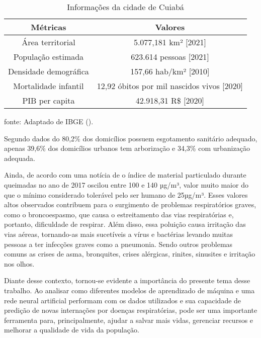 \documentclass[
  12pt,		%
  a4paper,	%
  openright,%
  oneside,	%
  chapter=TITLE,		%
  section=TITLE,		%
  english,	%
  french,	%
  spanish,	%
  brazil	%
]{abntex2}
\begin{document}
    \begin{table}[ht]
        \centering
        \caption{Informações da cidade de Cuiabá}
        \label{tabela cuiaba}
        \begin{tabular}{cc}
            \hline
            \multicolumn{1}{|c|}{Métricas} & \multicolumn{1}{c|}{Valores}\\
            \hline
            Área territorial & 5.077,181 km² [2021]\\
            População estimada & 623.614 pessoas [2021]\\
            Densidade demográfica & 157,66 hab/km² [2010]\\
            Mortalidade infantil & 12,92 óbitos por mil nascidos vivos [2020]\\
            PIB per capita & 42.918,31 R\$ [2020]\\
            \hline
        \end{tabular}
        \par
        {\small fonte: Adaptado de IBGE (\citeyear{ibge}).}
    \end{table}

    Segundo dados do \cite[]{ibge_mais} 80,2\% dos domicílios possuem esgotamento
    sanitário adequado, apenas 39,6\% dos domicílios urbanos tem arborização e
    34,3\% com urbanização adequada.

    Ainda, de acordo com uma notícia de \cite[]{queimadas_cuiaba} o índice de material
    particulado durante queimadas no ano de 2017 oscilou entre 100 e 140 µg/m³, valor
    muito maior do que o mínimo considerado tolerável pelo ser humano de 25µg/m³. Esses valores
    altos observados contribuem para o surgimento de problemas respiratórios graves, como o
    broncoespasmo, que causa o estreitamento das vias respiratórias e, portanto, dificuldade de
    respirar. Além disso, essa poluição causa irritação das vias aéreas, tornando-as mais
    sucetíveis a vírus e bactérias levando muitas pessoas a ter infecções graves como a pneumonia. 
    Sendo outros problemas comuns as crises de asma, bronquites,
    crises alérgicas, rinites, sinusites e irritação nos olhos.

    Diante desse contexto, tornou-se evidente a importância do presente tema desse trabalho. Ao analisar
    como diferentes modelos de aprendizado de máquina e uma rede neural artificial performam com os dados
    utilizados e sua capacidade de predição de novas internações por doenças respiratórias, pode ser uma
    importante ferramenta para, principalmente, ajudar a salvar mais vidas, gerenciar recursos e
    melhorar a qualidade de vida da população.
\end{document}
